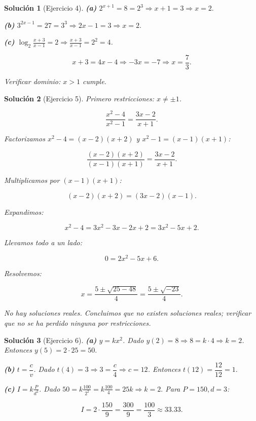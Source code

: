 \documentclass[12pt]{article}
\newtheorem{solution}{Solución}
\begin{document}
\begin{solution}[Ejercicio 4]
\textbf{(a)} \(2^{x+1}=8=2^3\Rightarrow x+1=3\Rightarrow x=2.\)

\textbf{(b)} \(3^{2x-1}=27=3^3\Rightarrow 2x-1=3\Rightarrow x=2.\)

\textbf{(c)} \(\log_2\frac{x+3}{x-1}=2\Rightarrow \frac{x+3}{x-1}=2^2=4\).


\[
x+3=4x-4\Rightarrow -3x=-7\Rightarrow x=\frac{7}{3}.
\]


Verificar dominio: \(x>1\) cumple.
\end{solution}

\begin{solution}[Ejercicio 5]
Primero restricciones: \(x\neq\pm1\).



\[
\frac{x^2-4}{x^2-1}=\frac{3x-2}{x+1}.
\]


Factorizamos \(x^2-4=(x-2)(x+2)\) y \(x^2-1=(x-1)(x+1)\):


\[
\frac{(x-2)(x+2)}{(x-1)(x+1)}=\frac{3x-2}{x+1}.
\]


Multiplicamos por \((x-1)(x+1)\):


\[
(x-2)(x+2)= (3x-2)(x-1).
\]


Expandimos:


\[
x^2-4 = 3x^2 -3x -2x +2 = 3x^2 -5x +2.
\]


Llevamos todo a un lado:


\[
0 = 2x^2 -5x +6.
\]


Resolvemos:


\[
x = \frac{5\pm\sqrt{25-48}}{4} = \frac{5\pm\sqrt{-23}}{4}.
\]


No hay soluciones reales. Concluimos que no existen soluciones reales; verificar que no se ha perdido ninguna por restricciones.
\end{solution}

\begin{solution}[Ejercicio 6]
\textbf{(a)} \(y=kx^2\). Dado \(y(2)=8\Rightarrow 8=k\cdot 4\Rightarrow k=2\). Entonces \(y(5)=2\cdot 25=50.\)

\textbf{(b)} \(t=\dfrac{c}{v}\). Dado \(t(4)=3\Rightarrow 3=\dfrac{c}{4}\Rightarrow c=12\). Entonces \(t(12)=\dfrac{12}{12}=1.\)

\textbf{(c)} \(I = k\frac{P}{d^2}\). Dado \(50 = k\frac{100}{2^2}=k\frac{100}{4}=25k\Rightarrow k=2.\) Para \(P=150,d=3\):


\[
I = 2\cdot\frac{150}{9} = \frac{300}{9} = \frac{100}{3}\approx 33.33.
\]


\end{solution}
\end{document}
